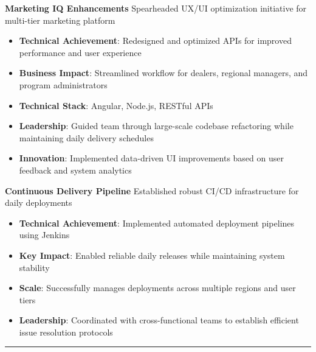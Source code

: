 \documentclass[letterpaper,10pt]{article}
\newcommand{\texthr}[1]{%
	\vspace{1em}
	\noindent #1 {\color{primary}\leaders\hrule\hfill}%
	\vspace{1em}
}
\begin{document}
\vspace{0.4em}\noindent\large\textbf{Marketing IQ Enhancements}\newline
\noindent Spearheaded UX/UI optimization initiative for multi-tier marketing platform
\begin{itemize}[leftmargin=*, nosep, itemsep=0.4em, before=\vspace{0.6em}, after=\vspace{0.8em}, label={}]
	\item \textbf{Technical Achievement}: Redesigned and optimized APIs for improved performance and user experience
	\item \textbf{Business Impact}: Streamlined workflow for dealers, regional managers, and program administrators
	\item \textbf{Technical Stack}: Angular, Node.js, RESTful APIs
	\item \textbf{Leadership}: Guided team through large-scale codebase refactoring while maintaining daily delivery schedules
	\item \textbf{Innovation}: Implemented data-driven UI improvements based on user feedback and system analytics
\end{itemize}

\vspace{0.4em}\noindent\large\textbf{Continuous Delivery Pipeline}\newline
\noindent Established robust CI/CD infrastructure for daily deployments
\begin{itemize}[leftmargin=*, nosep, itemsep=0.4em, before=\vspace{0.6em}, after=\vspace{0.8em}, label={}]
	\item \textbf{Technical Achievement}: Implemented automated deployment pipelines using Jenkins
	\item \textbf{Key Impact}: Enabled reliable daily releases while maintaining system stability
	\item \textbf{Scale}: Successfully manages deployments across multiple regions and user tiers
	\item \textbf{Leadership}: Coordinated with cross-functional teams to establish efficient issue resolution protocols
\end{itemize}

\texthr{}
\end{document}
